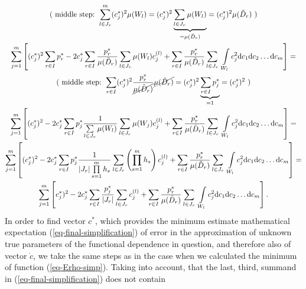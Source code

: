 \begin{gather}
\nonumber
\text{( middle step: } \sum_{l \in J_{r}}^{m}(c_{j}^{*})^{2} \mu(W_{l}) = (c_{j}^{*})^{2} \underbrace{\sum_{l \in J_{r}} \mu(W_{l})}_{=\mu(\tilde{D}_{r})} = (c_{j}^{*})^{2} \mu(\tilde{D}_{r}) \text{ )} \\
\nonumber
\sum\limits_{j=1}^{m} \left[  (c_{j}^{*})^{2}  \sum\limits_{r \in I} p_{r}^{*}  - 2c_{j}^{*}  \sum\limits_{r \in I} \frac{p_{r}^{*}}{\mu(\tilde{D}_{r})} \sum\limits_{l \in J_{r}} \mu(W_{l})  c_{j}^{(l)}  + \sum\limits_{r \in I} \frac{p_{r}^{*}}{\mu(\tilde{D}_{r})} \sum\limits_{l \in J_{r}} \ \int\limits_{W_{l}} c_{j}^{2}  \mathrm{d}c_{1} \mathrm{d}c_{2} \dots \mathrm{d}c_{m} \right] = \\
\nonumber
\text{( middle step: } \sum_{r \in I} (c_{j}^{*})^{2} \frac{p_{r}^{*}}{\cancel{\mu(\tilde{D}_{r})}} \cancel{\mu(\tilde{D}_{r})} = (c_{j}^{*})^{2} \underbrace{\sum_{r \in I} p_{j}^{*}}_{=1} = (c_{j}^{*})^{2} \text{ )}\\
\nonumber
\sum\limits_{j=1}^{m} \left[  (c_{j}^{*})^{2} - 2c_{j}^{*} \sum\limits_{r \in I} p_{j}^{*} \frac{1}{\sum\limits_{l \in J_{r}} \mu(W_{l})} \sum\limits_{l \in J_{r}} \mu(W_{j}) c_{j}^{(l)} +  \sum\limits_{r \in I} \frac{p_{r}^{*}}{\mu(\tilde{D}_{r})} \sum\limits_{l \in J_{r}} \ \int\limits_{W_{l}} c_{j}^{2}  \mathrm{d}c_{1} \mathrm{d}c_{2} \dots \mathrm{d}c_{m} \right] = \\
\nonumber
\sum\limits_{j=1}^{m}  \left[    (c_{j}^{*})^{2} - 2c_{j}^{*} \sum\limits_{r \in I} p_{j}^{*} \frac{1}{\left| J_{r} \right| \prod\limits_{s=1}^{m} h_{s}} \sum\limits_{l \in J_{r}} \left( \prod_{s=1}^{m} h_{s} \right) c_{j}^{(l)} +  \sum\limits_{r \in I} \frac{p_{r}^{*}}{\mu(\tilde{D}_{r})} \sum\limits_{l \in J_{r}} \ \int\limits_{W_{l}} c_{j}^{2}  \mathrm{d}c_{1} \mathrm{d}c_{2} \dots \mathrm{d}c_{m} \right] = \\
\sum\limits_{j=1}^{m} \left[ c_{j}^{*})^{2} - 2c_{j}^{*} \sum\limits_{r \in I} \frac{p_{j}^{*}}{ \left| J_{r} \right|} \sum\limits_{l \in J_{r}} c_{j}^{(l)} + \sum\limits_{r \in I} \frac{p_{r}^{*}}{\mu(\tilde{D}_{r})} \sum\limits_{l \in J_{r}} \ \int\limits_{W_{l}} c_{j}^{2}  \mathrm{d}c_{1} \mathrm{d}c_{2} \dots \mathrm{d}c_{m} \right]. \label{eq-final-simplification}
\end{gather}
In order to find vector $c^{*}$, which provides the minimum estimate mathematical expectation (\ref{eq-final-simplification}) of error in the approximation of unknown true parameters of the functional dependence in question, and therefore also of vector $\dot{c}$, we take the same steps as in the case when we calculated the minimum of function (\ref{eq-Erho-simp}). Taking into account, that the last, third, summand in (\ref{eq-final-simplification}) does not contain 
